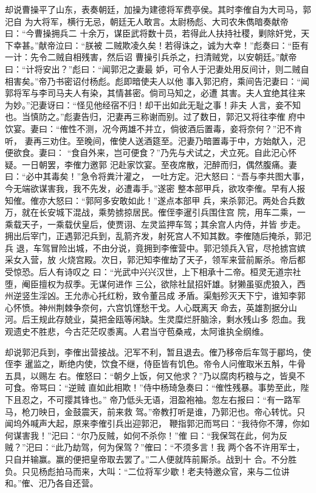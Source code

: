 却说曹操平了山东，表奏朝廷，加操为建德将军费亭侯。其时李傕自为大司马，郭汜自
为大将军，横行无忌，朝廷无人敢言。太尉杨彪、大司农朱儁暗奏献帝曰：“今曹操拥兵二
十余万，谋臣武将数十员，若得此人扶持社稷，剿除奸党，天下幸甚。”献帝泣曰：“朕被
二贼欺凌久矣！若得诛之，诚为大幸！”彪奏曰：“臣有一计：先令二贼自相残害，然后诏
曹操引兵杀之，扫清贼党，以安朝廷。”献帝曰：“计将安出？”彪曰：“闻郭汜之妻最
妒，可令人于汜妻处用反间计，则二贼自相害矣。”帝乃书密诏付杨彪。彪即暗使夫人以他
事入郭汜府，乘间告汜妻曰：“闻郭将军与李司马夫人有染，其情甚密。倘司马知之，必遭
其害。夫人宜绝其往来为妙。”汜妻讶曰：“怪见他经宿不归！却干出如此无耻之事！非夫
人言，妾不知也。当慎防之。”彪妻告归，汜妻再三称谢而别。过了数日，郭汜又将往李傕
府中饮宴。妻曰：“傕性不测，况今两雄不并立，倘彼酒后置毒，妾将奈何？”汜不肯听，
妻再三劝住。至晚间，傕使人送酒筵至。汜妻乃暗置毒于中，方始献入，汜便欲食。妻曰：
“食自外来，岂可便食？”乃先与犬试之，犬立死。自此汜心怀疑。一日朝罢，李傕力邀郭
汜赴家饮宴。至夜席散，汜醉而归，偶然腹痛。妻曰：“必中其毒矣！”急令将粪汁灌之，
一吐方定。汜大怒曰：“吾与李共图大事，今无端欲谋害我，我不先发，必遭毒手。”遂密
整本部甲兵，欲攻李傕。早有人报知傕。傕亦大怒曰：“郭阿多安敢如此！”遂点本部甲
兵，来杀郭汜。两处合兵数万，就在长安城下混战，乘势掳掠居民。傕侄李暹引兵围住宫
院，用车二乘，一乘载天子，一乘载伏皇后，使贾诩、左灵监押车驾；其余宫人内侍，并皆
步走。拥出后宰门，正遇郭汜兵到，乱箭齐发，射死宫人不知其数。李傕随后掩杀，郭汜兵
退，车驾冒险出城，不由分说，竟拥到李傕营中。郭汜领兵入官，尽抢掳宫嫔采女入营，放
火烧宫殿。次日，郭汜知李傕劫了天子，领军来营前厮杀。帝后都受惊恐。后人有诗叹之
曰：“光武中兴兴汉世，上下相承十二帝。桓灵无道宗社堕，阉臣擅权为叔季。无谋何进作
三公，欲除社鼠招奸雄。豺獭虽驱虎狼入，西州逆竖生淫凶。王允赤心托红粉，致令董吕成
矛盾。渠魁殄灭天下宁，谁知李郭心怀愤。神州荆棘争奈何，六宫饥馑愁干戈。人心既离天
命去，英雄割据分山河。后王规此存兢业，莫把金瓯等闲缺。生灵糜烂肝脑涂，剩水残山多
怨血。我观遗史不胜悲，今古茫茫叹黍离。人君当守苞桑戒，太阿谁执全纲维。

却说郭汜兵到，李傕出营接战。汜军不利，暂且退去。傕乃移帝后车驾于郿坞，使侄李
暹监之，断绝内使，饮食不继，侍臣皆有饥色。帝令人问傕取米五斛，牛骨五具，以赐左
右。傕怒曰：“朝夕上饭，何又他求？”乃以腐肉朽粮与之，皆臭不可食。帝骂曰：“逆贼
直如此相欺！”侍中杨琦急奏曰：“傕性残暴。事势至此，陛下且忍之，不可撄其锋也。”
帝乃低头无语，泪盈袍袖。忽左右报曰：“有一路军马，枪刀映日，金鼓震天，前来救
驾。”帝教打听是谁，乃郭汜也。帝心转忧。只闻坞外喊声大起，原来李傕引兵出迎郭汜，
鞭指郭汜而骂曰：“我待你不薄，你如何谋害我！”汜曰：“尔乃反贼，如何不杀你！”傕
曰：“我保驾在此，何为反贼？”汜曰：“此乃劫驾，何为保驾？”傕曰：“不须多言！我
两个各不许用军士，只自并输赢。赢的便把皇帝取去罢了。”二人便就阵前厮杀。战到十
合。不分胜负。只见杨彪拍马而来，大叫：“二位将军少歇！老夫特邀众官，来与二位讲
和。”傕、汜乃各自还营。


